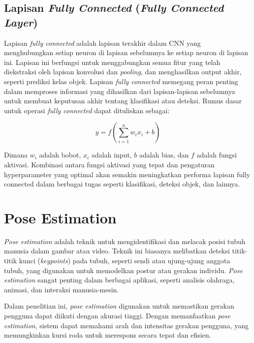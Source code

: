 \subsection{Lapisan \emph{Fully Connected} (\emph{Fully Connected Layer})}
\label{subsec:Fully Connected Layer}

Lapisan \emph{fully connected} adalah lapisan terakhir dalam CNN yang menghubungkan setiap neuron di lapisan sebelumnya ke setiap neuron di lapisan ini. Lapisan ini berfungsi untuk menggabungkan semua fitur yang telah diekstraksi oleh lapisan konvolusi dan \emph{pooling}, dan menghasilkan output akhir, seperti prediksi kelas objek. Lapisan \emph{fully connected} memegang peran penting dalam memproses informasi yang dihasilkan dari lapisan-lapisan sebelumnya untuk membuat keputusan akhir tentang klasifikasi atau deteksi. Rumus dasar untuk operasi \emph{fully connected} dapat dituliskan sebagai:

\begin{equation}
  y = f\left(\sum_{i=1}^{n} w_i x_i + b\right)
\end{equation}

Dimana \( w_i \) adalah bobot, \( x_i \) adalah input, \( b \) adalah bias, dan \( f \) adalah fungsi aktivasi. Kombinasi antara fungsi aktivasi yang tepat dan pengaturan hyperparameter yang optimal akan semakin meningkatkan performa lapisan fully connected dalam berbagai tugas seperti klasifikasi, deteksi objek, dan lainnya.

\section{Pose Estimation}
\label{sec:Pose Estimation}

\emph{Pose estimation} adalah teknik untuk mengidentifikasi dan melacak posisi tubuh manusia dalam gambar atau video. Teknik ini biasanya melibatkan deteksi titik-titik kunci (\emph{keypoints}) pada tubuh, seperti sendi atau ujung-ujung anggota tubuh, yang digunakan untuk memodelkan postur atau gerakan individu. \emph{Pose estimation} sangat penting dalam berbagai aplikasi, seperti analisis olahraga, animasi, dan interaksi manusia-mesin.

Dalam penelitian ini, \emph{pose estimation} digunakan untuk memastikan gerakan pengguna dapat diikuti dengan akurasi tinggi. Dengan memanfaatkan \emph{pose estimation}, sistem dapat memahami arah dan intensitas gerakan pengguna, yang memungkinkan kursi roda untuk merespons secara tepat dan efisien.

